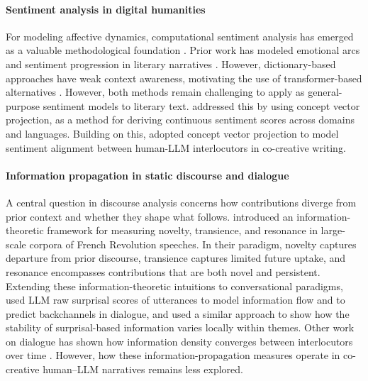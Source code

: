 \documentclass[11pt]{article}
\begin{document}
\paragraph{Sentiment analysis in digital humanities}
For modeling affective dynamics, computational sentiment analysis has emerged as a valuable methodological foundation \cite{mohammad2016sentiment}. Prior work has modeled emotional arcs and sentiment progression in literary narratives \citep{reagan2016emotional, hu2021dynamic, ohman2022computational}. However, dictionary-based approaches have weak context awareness, motivating the use of transformer-based alternatives \cite{feldkamp2024comparing}. However, both methods  remain challenging to apply as general-purpose sentiment models to literary text. \citet{Lyngbaek_2026} addressed this by using concept vector projection, as a method for deriving continuous sentiment scores across domains and languages. Building on this, \citet{fundal2026directionalalignmentnarrativeagency} adopted concept vector projection to model sentiment alignment between human-LLM interlocutors in co-creative writing.  

\paragraph{Information propagation in static discourse and dialogue}
A central question in discourse analysis concerns how contributions diverge from prior context and whether they shape what follows. \citet{barron2018individuals} introduced an information-theoretic framework for measuring novelty, transience, and resonance in large-scale corpora of French Revolution speeches. In their paradigm, novelty captures departure from prior discourse, transience captures limited future uptake, and resonance encompasses contributions that are both novel and persistent.  Extending these information-theoretic intuitions to conversational paradigms, \citet{bergey2024yeah} used LLM raw surprisal scores of utterances to model information flow and to predict backchannels in dialogue, and \citet{maes-etal-2022-shared} used a similar approach to show how the stability of surprisal-based information varies locally within themes. Other work on dialogue has shown how information density converges between interlocutors over time \cite{xu2018information}. However, how these information-propagation measures operate in co-creative human–LLM narratives remains less explored.  

\end{document}
